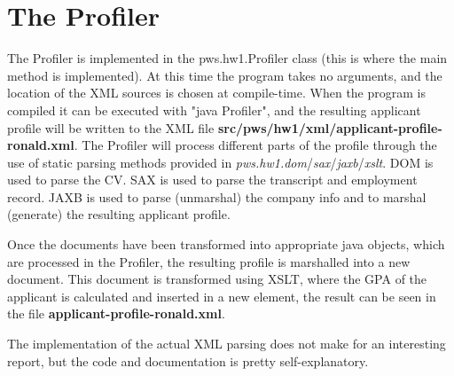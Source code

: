 \documentclass[conference, a4paper]{IEEEtran}
\begin{document}
\section{The Profiler}
The Profiler is implemented in the pws.hw1.Profiler class (this is where the main method is implemented). At this time the program takes no arguments, and the location of the XML sources is chosen at compile-time. When the program is compiled it can be executed with "java Profiler", and the resulting applicant profile will be written to the XML file \textbf{src/pws/hw1/xml/applicant-profile-ronald.xml}. The Profiler will process different parts of the profile through the use of static parsing methods provided in \textit{pws.hw1.dom}/\textit{sax}/\textit{jaxb}/\textit{xslt}. DOM is used to parse the CV. SAX is used to parse the transcript and employment record. JAXB is used to parse (unmarshal) the company info and to marshal (generate) the resulting applicant profile.

Once the documents have been transformed into appropriate java objects, which are processed in the Profiler, the resulting profile is marshalled into a new document. This document is transformed using XSLT, where the GPA of the applicant is calculated and inserted in a new element, the result can be seen in the file \textbf{applicant-profile-ronald.xml}.

The implementation of the actual XML parsing does not make for an interesting report, but the code and documentation is pretty self-explanatory. 
\end{document}
